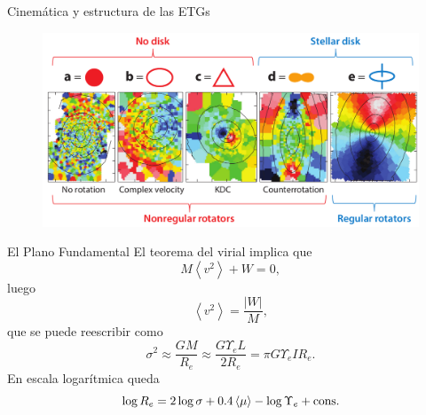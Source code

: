 \documentclass[xcolor=dvipsnames,4pt]{beamer}
\newenvironment{changemargin}[2]{%
  \begin{list}{}{%
    \setlength{\topsep}{0pt}%
    \setlength{\leftmargin}{#1}%
    \setlength{\rightmargin}{#2}%
    \setlength{\listparindent}{\parindent}%
    \setlength{\itemindent}{\parindent}%
    \setlength{\parsep}{\parskip}%
  }%
\item[]}{\end{list}}
\begin{document}
\begin{frame}{Cinemática y estructura de las ETGs}
\begin{changemargin}{-1cm}{-1cm}
\begin{figure}
\includegraphics[scale=0.70]{img/cin_clas.png}
\end{figure}
\end{changemargin}
\end{frame}

\begin{frame}{El Plano Fundamental}
El teorema del virial implica que
$$
M\left<v^2\right> + W = 0,
$$
luego
$$
\left<v^2\right> = \frac{|W|}{M},
$$
que se puede reescribir como
$$
\sigma^2 \approx \frac{GM}{R_e} \approx \frac{G\Upsilon_e L}{2R_e} = \pi G\Upsilon_e I R_e.
$$
En escala logarítmica queda
$$
\log{R_e} = 2\log{\sigma} + 0.4\left<\mu\right> - \log{\Upsilon_e} + {\rm cons}.
$$
\end{frame}
\end{document}
